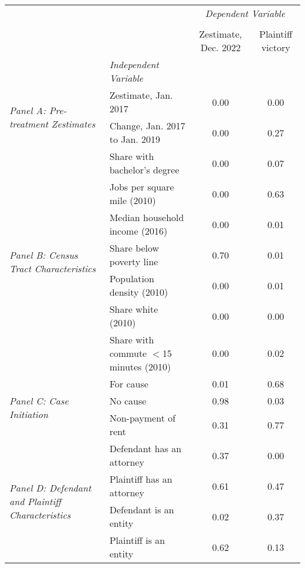 \begin{tabular}{llcc}
\toprule
 &  & \multicolumn{2}{c}{\textit{Dependent Variable}} \\
\cline{3-4}
\\
 &  & Zestimate, Dec. 2022 & Plaintiff victory \\
 & \emph{Independent Variable} &  &  \\
\midrule
\multirow[c]{2}{3cm}{\textit{Panel A: Pre-treatment Zestimates}} & Zestimate, Jan. 2017 & 0.00 & 0.00 \\
 & Change, Jan. 2017 to Jan. 2019 & 0.00 & 0.27 \\
\cline{1-4}
\multirow[c]{7}{3cm}{\textit{Panel B: Census Tract Characteristics}} & Share with bachelor's degree & 0.00 & 0.07 \\
 & Jobs per square mile (2010) & 0.00 & 0.63 \\
 & Median household income (2016) & 0.00 & 0.01 \\
 & Share below poverty line & 0.70 & 0.01 \\
 & Population density (2010) & 0.00 & 0.01 \\
 & Share white (2010) & 0.00 & 0.00 \\
 & Share with commute $<$15 minutes (2010) & 0.00 & 0.02 \\
\cline{1-4}
\multirow[c]{3}{3cm}{\textit{Panel C: Case Initiation}} & For cause & 0.01 & 0.68 \\
 & No cause & 0.98 & 0.03 \\
 & Non-payment of rent & 0.31 & 0.77 \\
\cline{1-4}
\multirow[c]{4}{3cm}{\textit{Panel D: Defendant and Plaintiff Characteristics}} & Defendant has an attorney & 0.37 & 0.00 \\
 & Plaintiff has an attorney & 0.61 & 0.47 \\
 & Defendant is an entity & 0.02 & 0.37 \\
 & Plaintiff is an entity & 0.62 & 0.13 \\
\cline{1-4}
\bottomrule
\end{tabular}
